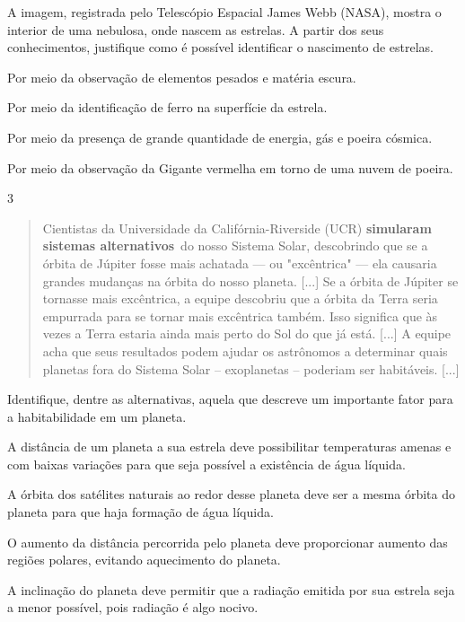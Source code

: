 A imagem, registrada pelo Telescópio Espacial James Webb (NASA), mostra o
interior de uma nebulosa, onde nascem as estrelas. A partir dos seus
conhecimentos, justifique como é possível identificar o nascimento de
estrelas.

\begin{escolha}
\item
  Por meio da observação de elementos pesados e matéria escura.
\item
  Por meio da identificação de ferro na superfície da estrela.
\item
  Por meio da presença de grande quantidade de energia, gás e poeira cósmica.
\item
 Por meio da observação da Gigante vermelha em torno de uma nuvem de poeira.
\end{escolha}

\num{3}

\begin{quote}
Cientistas da Universidade da Califórnia-Riverside
(UCR) \textbf{simularam sistemas alternativos}~do nosso Sistema Solar,
descobrindo que se a órbita de Júpiter fosse mais achatada --- ou
"excêntrica" --- ela causaria grandes mudanças na órbita do nosso planeta. [...]
Se a órbita de Júpiter se tornasse mais excêntrica, a equipe
descobriu que a órbita da Terra seria empurrada para se tornar mais
excêntrica também. Isso significa que às vezes a Terra estaria ainda
mais perto do Sol do que já está. [...]
A equipe acha que seus resultados
podem ajudar os astrônomos a determinar quais planetas fora do Sistema
Solar -- exoplanetas -- poderiam ser habitáveis. [...]

\end{quote}

Identifique, dentre as alternativas, aquela que descreve um importante
fator para a habitabilidade em um planeta.

\begin{escolha}
\item
  A distância de um planeta a sua estrela deve possibilitar temperaturas
  amenas e com baixas variações para que seja possível a existência de
  água líquida.
\item
  A órbita dos satélites naturais ao redor desse planeta deve ser a
  mesma órbita do planeta para que haja formação de água líquida.
\item
  O aumento da distância percorrida pelo planeta deve proporcionar
  aumento das regiões polares, evitando aquecimento do planeta.
\item
  A inclinação do planeta deve permitir que a radiação emitida por sua
  estrela seja a menor possível, pois radiação é algo nocivo.
\end{escolha}



